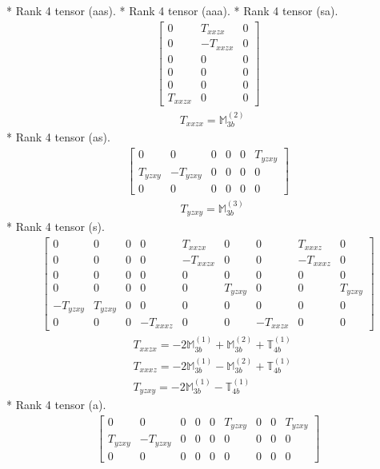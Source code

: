 \documentclass[fleqn,8pt,landscape]{jsarticle}
\begin{document}
* Rank 4 tensor (aas).
* Rank 4 tensor (aaa).
* Rank 4 tensor (sa).
\begin{align*}
\begin{bmatrix} 0 & T_{xxzx} & 0 \\ 0 & - T_{xxzx} & 0 \\ 0 & 0 & 0 \\ 0 & 0 & 0 \\ 0 & 0 & 0 \\ T_{xxzx} & 0 & 0 \end{bmatrix}
\end{align*}
\begin{align*}
& T_{xxzx} = \mathbb{M}_{3b}^{(2)}
\end{align*}
* Rank 4 tensor (as).
\begin{align*}
\begin{bmatrix} 0 & 0 & 0 & 0 & 0 & T_{yzxy} \\ T_{yzxy} & - T_{yzxy} & 0 & 0 & 0 & 0 \\ 0 & 0 & 0 & 0 & 0 & 0 \end{bmatrix}
\end{align*}
\begin{align*}
& T_{yzxy} = \mathbb{M}_{3b}^{(3)}
\end{align*}
* Rank 4 tensor (s).
\begin{align*}
\begin{bmatrix} 0 & 0 & 0 & 0 & T_{xxzx} & 0 & 0 & T_{xxxz} & 0 \\ 0 & 0 & 0 & 0 & - T_{xxzx} & 0 & 0 & - T_{xxxz} & 0 \\ 0 & 0 & 0 & 0 & 0 & 0 & 0 & 0 & 0 \\ 0 & 0 & 0 & 0 & 0 & T_{yzxy} & 0 & 0 & T_{yzxy} \\ - T_{yzxy} & T_{yzxy} & 0 & 0 & 0 & 0 & 0 & 0 & 0 \\ 0 & 0 & 0 & - T_{xxxz} & 0 & 0 & - T_{xxzx} & 0 & 0 \end{bmatrix}
\end{align*}
\begin{align*}
& T_{xxzx} = - 2 \mathbb{M}_{3b}^{(1)} + \mathbb{M}_{3b}^{(2)} + \mathbb{T}_{4b}^{(1)} \\
& T_{xxxz} = - 2 \mathbb{M}_{3b}^{(1)} - \mathbb{M}_{3b}^{(2)} + \mathbb{T}_{4b}^{(1)} \\
& T_{yzxy} = - 2 \mathbb{M}_{3b}^{(1)} - \mathbb{T}_{4b}^{(1)}
\end{align*}
* Rank 4 tensor (a).
\begin{align*}
\begin{bmatrix} 0 & 0 & 0 & 0 & 0 & T_{yzxy} & 0 & 0 & T_{yzxy} \\ T_{yzxy} & - T_{yzxy} & 0 & 0 & 0 & 0 & 0 & 0 & 0 \\ 0 & 0 & 0 & 0 & 0 & 0 & 0 & 0 & 0 \end{bmatrix}
\end{align*}
\end{document}
